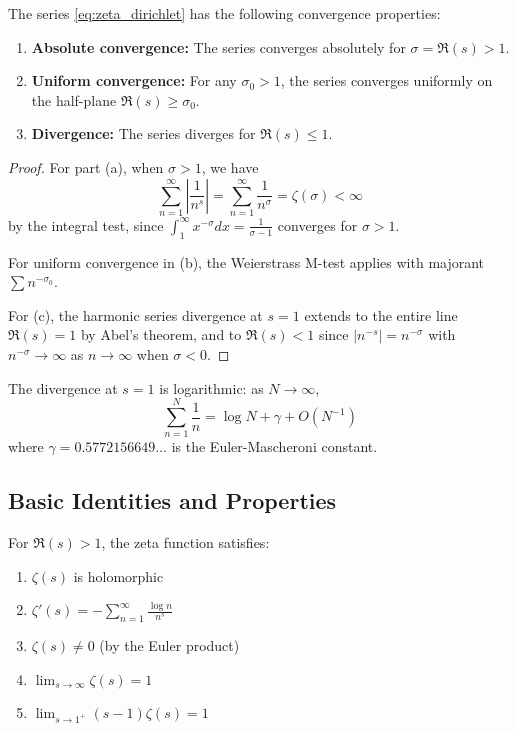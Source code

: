 \begin{theorem}
\label{thm:convergence}
The series \eqref{eq:zeta_dirichlet} has the following convergence properties:
\begin{enumerate}[label=(\alph*)]
\item \textbf{Absolute convergence:} The series converges absolutely for $\sigma = \Re(s) > 1$.
\item \textbf{Uniform convergence:} For any $\sigma_0 > 1$, the series converges uniformly on the half-plane $\Re(s) \geq \sigma_0$.
\item \textbf{Divergence:} The series diverges for $\Re(s) \leq 1$.
\end{enumerate}
\end{theorem}

\begin{proof}
For part (a), when $\sigma > 1$, we have
\[
\sum_{n=1}^{\infty} \left|\frac{1}{n^s}\right| = \sum_{n=1}^{\infty} \frac{1}{n^\sigma} = \zeta(\sigma) < \infty
\]
by the integral test, since $\int_1^{\infty} x^{-\sigma} dx = \frac{1}{\sigma-1}$ converges for $\sigma > 1$.

For uniform convergence in (b), the Weierstrass M-test applies with majorant $\sum n^{-\sigma_0}$.

For (c), the harmonic series divergence at $s = 1$ extends to the entire line $\Re(s) = 1$ by Abel's theorem, and to $\Re(s) < 1$ since $|n^{-s}| = n^{-\sigma}$ with $n^{-\sigma} \to \infty$ as $n \to \infty$ when $\sigma < 0$.
\end{proof}

\begin{remark}
The divergence at $s = 1$ is logarithmic: as $N \to \infty$, 
\[
\sum_{n=1}^N \frac{1}{n} = \log N + \gamma + O(N^{-1})
\]
where $\gamma = 0.5772156649\ldots$ is the Euler-Mascheroni constant.
\end{remark}

\subsection{Basic Identities and Properties}

\begin{proposition}
\label{prop:basic_properties}
For $\Re(s) > 1$, the zeta function satisfies:
\begin{enumerate}[label=(\alph*)]
\item $\zeta(s)$ is holomorphic
\item $\zeta'(s) = -\sum_{n=1}^{\infty} \frac{\log n}{n^s}$
\item $\zeta(s) \neq 0$ (by the Euler product)
\item $\lim_{s \to \infty} \zeta(s) = 1$
\item $\lim_{s \to 1^+} (s-1)\zeta(s) = 1$
\end{enumerate}
\end{proposition}

